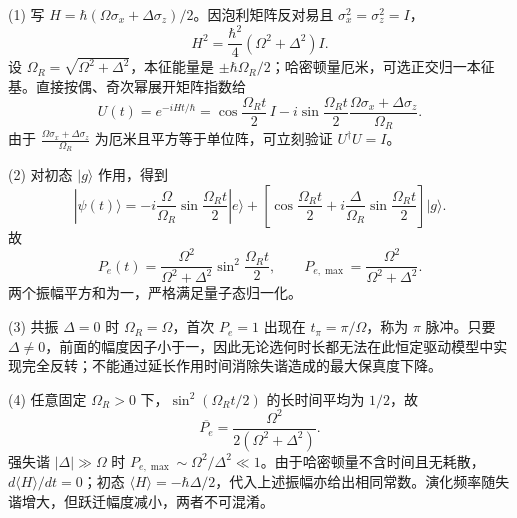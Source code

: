 (1) 写 \(H=\hbar(\Omega\sigma_x+\Delta\sigma_z)/2\)。因泡利矩阵反对易且 \(\sigma_x^2=\sigma_z^2=I\)，
\[
H^2=\frac{\hbar^2}{4}(\Omega^2+\Delta^2)I.
\]
设 \(\Omega_R=\sqrt{\Omega^2+\Delta^2}\)，本征能量是 \(\pm\hbar\Omega_R/2\)；哈密顿量厄米，可选正交归一本征基。直接按偶、奇次幂展开矩阵指数给
\[
U(t)=e^{-iHt/\hbar}=\cos\frac{\Omega_R t}{2}\,I-
i\sin\frac{\Omega_R t}{2}\frac{\Omega\sigma_x+\Delta\sigma_z}{\Omega_R}.
\]
由于 \(\frac{\Omega\sigma_x+\Delta\sigma_z}{\Omega_R}\) 为厄米且平方等于单位阵，可立刻验证 \(U^\dagger U=I\)。

(2) 对初态 \(|g\rangle\) 作用，得到
\[
|\psi(t)\rangle=-i\frac{\Omega}{\Omega_R}\sin\frac{\Omega_Rt}{2}|e\rangle+
\left[\cos\frac{\Omega_Rt}{2}+i\frac{\Delta}{\Omega_R}\sin\frac{\Omega_Rt}{2}\right]|g\rangle.
\]
故
\[
P_e(t)=\frac{\Omega^2}{\Omega^2+\Delta^2}\sin^2\frac{\Omega_Rt}{2},\qquad
P_{e,\max}=\frac{\Omega^2}{\Omega^2+\Delta^2}.
\]
两个振幅平方和为一，严格满足量子态归一化。

(3) 共振 \(\Delta=0\) 时 \(\Omega_R=\Omega\)，首次 \(P_e=1\) 出现在 \(t_\pi=\pi/\Omega\)，称为 \(\pi\) 脉冲。只要 \(\Delta\ne0\)，前面的幅度因子小于一，因此无论选何时长都无法在此恒定驱动模型中实现完全反转；不能通过延长作用时间消除失谐造成的最大保真度下降。

(4) 任意固定 \(\Omega_R>0\) 下，\(\sin^2(\Omega_R t/2)\) 的长时间平均为 \(1/2\)，故
\[
\overline{P_e}=\frac{\Omega^2}{2(\Omega^2+\Delta^2)}.
\]
强失谐 \(|\Delta|\gg\Omega\) 时 \(P_{e,\max}\sim\Omega^2/\Delta^2\ll1\)。由于哈密顿量不含时间且无耗散，\(d\langle H\rangle/dt=0\)；初态 \(\langle H\rangle=-\hbar\Delta/2\)，代入上述振幅亦给出相同常数。演化频率随失谐增大，但跃迁幅度减小，两者不可混淆。
